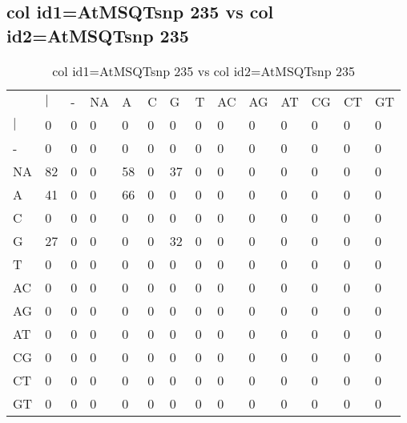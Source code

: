 \subsection{col id1=AtMSQTsnp 235 vs col id2=AtMSQTsnp 235}
\begin{center}
\begin{longtable}{|l|l|l|l|l|l|l|l|l|l|l|l|l|l|}
\caption{col id1=AtMSQTsnp 235 vs col id2=AtMSQTsnp 235} \label{table_dm794}\\
\hline
\\
\hline
&$|$&-&NA&A&C&G&T&AC&AG&AT&CG&CT&GT\\
$|$&0&0&0&0&0&0&0&0&0&0&0&0&0\\
-&0&0&0&0&0&0&0&0&0&0&0&0&0\\
NA&82&0&0&58&0&37&0&0&0&0&0&0&0\\
A&41&0&0&66&0&0&0&0&0&0&0&0&0\\
C&0&0&0&0&0&0&0&0&0&0&0&0&0\\
G&27&0&0&0&0&32&0&0&0&0&0&0&0\\
T&0&0&0&0&0&0&0&0&0&0&0&0&0\\
AC&0&0&0&0&0&0&0&0&0&0&0&0&0\\
AG&0&0&0&0&0&0&0&0&0&0&0&0&0\\
AT&0&0&0&0&0&0&0&0&0&0&0&0&0\\
CG&0&0&0&0&0&0&0&0&0&0&0&0&0\\
CT&0&0&0&0&0&0&0&0&0&0&0&0&0\\
GT&0&0&0&0&0&0&0&0&0&0&0&0&0\\
\hline
\end{longtable}
\end{center}

